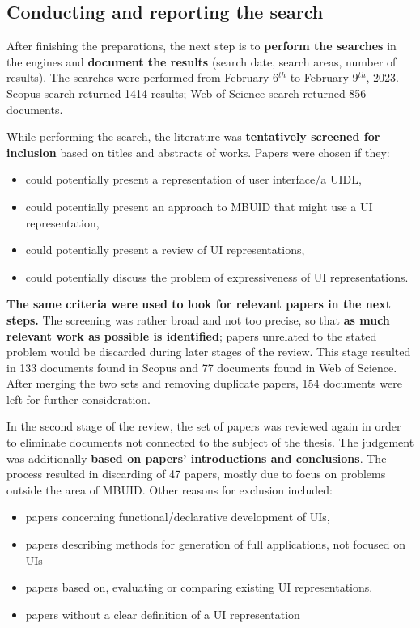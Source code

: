\subsection{Conducting and reporting the search}\label{subsec:conducting-and-reporting-the-search}

After finishing the preparations, the next step is to \textbf{perform the searches} in the engines and \textbf{document the results} (search date, search areas, number of results).
The searches were performed from February 6$^{th}$ to February 9$^{th}$, 2023.
Scopus search returned 1414 results;
Web of Science search returned 856 documents.

While performing the search, the literature was \textbf{tentatively screened for inclusion} based on titles and abstracts of works.
Papers were chosen if they:
\begin{itemize}
    \item could potentially present a representation of user interface/a UIDL,
    \item could potentially present an approach to MBUID that might use a UI representation,
    \item could potentially present a review of UI representations,
    \item could potentially discuss the problem of expressiveness of UI representations.
\end{itemize}
\textbf{The same criteria were used to look for relevant papers in the next steps.}
The screening was rather broad and not too precise, so that \textbf{as much relevant work as possible is identified};
papers unrelated to the stated problem would be discarded during later stages of the review.
This stage resulted in 133 documents found in Scopus and 77 documents found in Web of Science.
After merging the two sets and removing duplicate papers, 154 documents were left for further consideration.

In the second stage of the review, the set of papers was reviewed again in order to eliminate documents not connected to the subject of the thesis.
The judgement was additionally \textbf{based on papers' introductions and conclusions}.
The process resulted in discarding of 47 papers, mostly due to focus on problems outside the area of MBUID\@.
Other reasons for exclusion included:
\begin{itemize}
    \item papers concerning functional/declarative development of UIs,
    \item papers describing methods for generation of full applications, not focused on UIs
    \item papers based on, evaluating or comparing existing UI representations.
    \item papers without a clear definition of a UI representation
\end{itemize}

